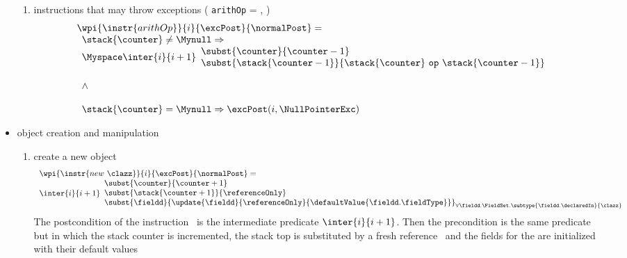 \begin{itemize}
\begin{enumerate}
	
						
		\item instructions that may throw exceptions ( \texttt{arithOp} =  ,  )\\
				$$ \begin{array}{l}
                                         \wpi{\instr{arithOp } } {i} {\excPost}{\normalPost}  = \\
					 \begin{array}{l}
				                \stack{\counter} \neq \Mynull \Rightarrow \\
						\Myspace  \inter{i}{i+1} \begin{array}{l}
                                                                               \subst{\counter}{ \counter   - 1} \\
						                               \subst{\stack{\counter - 1}} { \stack{\counter} \ \texttt{op}  \ \stack{\counter -1}} 
                                                                          \end{array}\\
						\\
					        \wedge \\				
						\\
						\stack{\counter} = \Mynull \Rightarrow 	\excPost(i, \NullPointerExc)             
                               	\end{array} 
				 \end{array}$$
	\end{enumerate}

\item  object creation and manipulation 
	\begin{enumerate}
		\item create a new object \\
		$$ \begin{array}{l}
                         \wpi{\instr{new  \ \clazz }} {i} {\excPost}{\normalPost}  =  \\
			\inter{i}{i+1} 
			\begin{array}{l} 
                               \subst{ \counter}{ \counter + 1 } \\
			       \subst{ \stack{ \counter + 1} }{\referenceOnly} \\
		               \subst{ \fieldd} { \update{\fieldd} { \referenceOnly }{\defaultValue{ \fieldd.  \fieldType } } }_{{\small \forall \fieldd: \FieldSet. \subtype{\fieldd.\declaredIn}{  \clazz}} } 
		       \end{array}
              \end{array}$$
		  The postcondition of the instruction \new \ is the intermediate predicate $\inter{i}{i+1}$. Then the precondition is the same predicate but in which the stack
		  counter is incremented, the stack top is substituted by a fresh reference  \ and the fields for the 
		   are initialized with their default values 
	

\end{enumerate}
\end{itemize}

